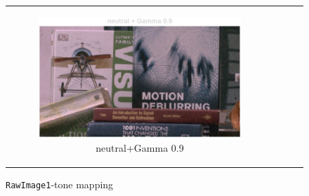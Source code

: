 \documentclass[11pt, a4]{article}
\begin{document}
\begin{enumerate}
\begin{enumerate}
\begin{figure}[h]
{\begin{tabular}{cccc}
\begin{subfigure}[h]{0.45\linewidth}
							\includegraphics[width=\linewidth]{../output/RawImage1_Tone_neutral_Gamma0.9.pdf}
							\caption{neutral+Gamma 0.9}
							\label{fig:RawImage1_tone_12}
						\end{subfigure}
					\end{tabular}
				}
				\caption{\texttt{RawImage1}-tone mapping}
				\label{fig:RawImage1_tone}
			\end{figure}
			\begin{figure}[h]
				\centering
\end{figure}
\end{enumerate}
\end{enumerate}
\end{document}
